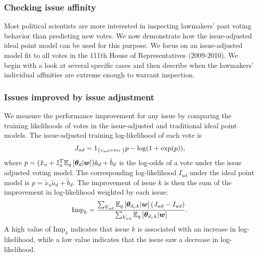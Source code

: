 
\subsubsection{Checking issue affinity}
Most political scientists are more interested in inspecting lawmakers'
past voting behavior than predicting new votes.  We now demonstrate
how the issue-adjusted ideal point model can be used for this purpose.
We focus on an issue-adjusted model fit to all votes in the 111th
House of Representatives (2009-2010). We begin with a look at several
specific cases and then describe when the lawmakers' individual
affinities are extreme enough to warrant inspection.

\subsubsection{Issues improved by issue adjustment}
We measure the performance improvement for any issue by comparing the
training likelihoods of votes in the issue-adjusted and traditional
ideal point models.  The issue-adjusted training log-likelihood of
each vote is
\begin{equation}
  J_{ud} = 1_{\{v_{ud} = \mbox{\tiny Yes \normalsize}\}} p - \log(1 + \exp(p)),
\end{equation}
where $p = (\tilde x_u + \bm \tilde z_{u}^T \mathbb{E}_q\left[\bm \theta_d | \bm w\right] ) \tilde a_d
+ \tilde b_d$ is the log-odds of a vote under the issue adjusted
voting model.  The corresponding log-likelihood
$I_{ud}$ under the ideal point model is $p=\tilde x_u \tilde a_d +
\tilde b_d$. The improvement of issue $k$ is then the sum of the
improvement in log-likelihood weighted by each issue:
\begin{equation}
  \label{equation:likelihood_improvement}
  \mbox{Imp}_k = \frac{\sum_{V_{ud}} \mathbb{E}_q\left[\bm \theta_{d_v k} | \bm w\right] (J_{ud} - I_{ud}) }
       { \sum_{V_{ud}} \mathbb{E}_q\left[\bm \theta_{d_v k} | \bm w\right] }.
\end{equation}
A high value of $\mbox{Imp}_k$ indicates that issue $k$ is associated
with an increase in log-likelihood, while a low value indicates that
the issue saw a decrease in log-likelihood.

